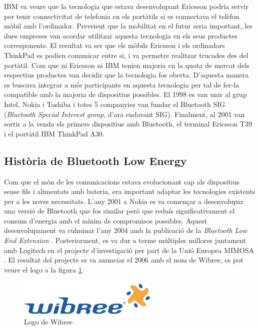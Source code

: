 IBM va veure que la tecnologia que estava desenvolupant Ericsson podria servir per tenir connectivitat de telefonia en els portàtils si es connectava el telèfon mòbil amb l'ordinador.
Preveient que la mobilitat en el futur seria important, les dues empreses van acordar utilitzar aquesta tecnologia en els seus productes corresponents.
El resultat va ser que els mòbils Ericsson i els ordinadors ThinkPad es podien comunicar entre si, i va permetre realitzar trucades des del portàtil.
Com que ni Ericsson ni IBM tenien majoria en la quota de mercat dels respectius productes van decidir que la tecnologia fos oberta.
D'aquesta manera es buscava integrar a més participants en aquesta tecnologia per tal de fer-la compatible amb la majoria de dispositius possibles.
El 1998 es van unir al grup Intel, Nokia i Toshiba i totes 5 companyies van fundar el Bluetooth SIG (\textit{Bluetooth Special Interest group}, d'ara endavant SIG).
Finalment, al 2001 van sortir a la venda els primers dispositius amb Bluetooth, el terminal Ericsson T39 i el portàtil IBM ThinkPad A30.

\subsection{Història de Bluetooth Low Energy}
Com que el món de les comunicacions estava evolucionant cap als dispositius sense fils i alimentats amb bateria, era important adaptar les tecnologies existents per a les noves necessitats.
L'any 2001 a Nokia es va començar a desenvolupar una versió de Bluetooth que fos similar però que reduís significativament el consum d'energia amb el mínim de compromisos possibles.
Aquest desenvolupament va culminar l'any 2004 amb la publicació de la \textit{Bluetooth Low End Extension} \cite{Original_BLE_Extension}. 
Posteriorment, es va dur a terme múltiples millores juntament amb Logitech en el projecte d'investigació per part de la Unió Europea MIMOSA \cite{MIMOSA}.
El resultat del projecte es va anunciar el 2006 amb el nom de Wibree, es pot veure el logo a la figura \ref{wibree_logo}.

\begin{figure}[hb]
	\begin{center}
		\includegraphics[width=0.6\textwidth]{./images/Wibree_Logo.png}
		\caption{Logo de Wibree}
		\label{wibree_logo}
	\end{center}
\end{figure}

